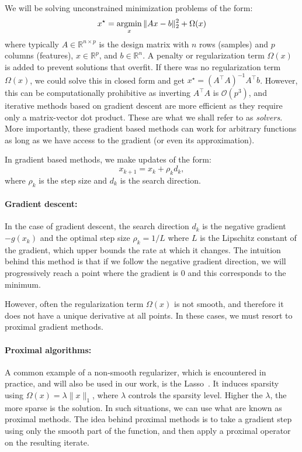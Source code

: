 We will be solving unconstrained minimization problems of the form:
\begin{equation}
x^{\star} = \mathop{\mathrm{argmin}}_x \|Ax - b\|_{2}^2 + \Omega(x)
\end{equation}
\label{eq:linreg_minimize}
%
where typically $A \in \mathbb{R}^{n \times p}$ is the design matrix with $n$ rows (samples) and $p$ columns (features), $x \in \mathbb{R}^p$, and $b \in \mathbb{R}^n$. A penalty or regularization term $\Omega(x)$ is added to prevent solutions that overfit. 
If there was no regularization term $\Omega(x)$, we could solve this in closed form and get $x^{\star} = {(A^{\top}A)}^{-1}A^{\top}b$. However, this can be computationally prohibitive as inverting $A^{\top}A$ is $\mathcal{O}(p^3)$, and iterative methods based on gradient descent are more efficient as they require only a matrix-vector dot product. These are what we shall refer to as \emph{solvers}. More importantly, these gradient based methods can work for arbitrary functions as long as we have access to the gradient (or even its approximation).

In gradient based methods, we make updates of the  form:
%
\begin{equation}
x_{k + 1} = x_{k} + \rho_k d_k,
\end{equation}
\label{eq:update_term}
%
where $\rho_k$ is the step size and $d_k$ is the search direction.

\paragraph{Gradient descent: } In the case of gradient descent, the search direction $d_k$ is the negative gradient $-g(x_k)$ and the optimal step size $\rho_k=1/L$ where $L$ is the Lipschitz constant of the gradient, which upper bounds the rate at which it changes. The intuition behind this method is that if we follow the negative gradient direction, we will progressively reach a point where the gradient is 0 and this corresponds to the minimum.

However, often the regularization term $\Omega(x)$ is not smooth, and therefore it does not have a unique derivative at all points. In these cases, we must resort to proximal gradient methods.

\paragraph{Proximal algorithms: } A common example of a non-smooth regularizer, which is encountered in practice, and will also be used in our work, is the Lasso~\citep{tibshirani1996regression}. It induces sparsity using $\Omega(x) = \lambda \|x\|_1$, where $\lambda$ controls the sparsity level. Higher the $\lambda$, the more sparse is the solution. In such situations, we can use what are known as proximal methods. The idea behind proximal methods is to take a gradient step using only the smooth part of the function, and then apply a proximal operator on the resulting iterate. 

